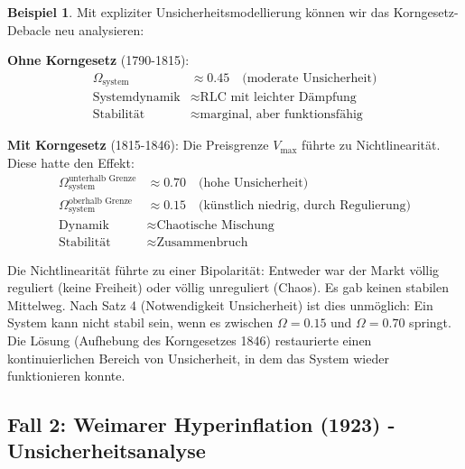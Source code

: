 \documentclass[a4paper,12pt,twoside]{report}
\theoremstyle{definition}
\newtheorem{beispiel}{Beispiel}
\begin{document}
\begin{beispiel}

Mit expliziter Unsicherheitsmodellierung können wir das Korngesetz-Debacle neu analysieren:

\textbf{Ohne Korngesetz} (1790-1815):
\begin{align}
\Omega_{\text{system}} &\approx 0.45 \quad \text{(moderate Unsicherheit)} \\
\text{Systemdynamik} &\approx \text{RLC mit leichter Dämpfung} \\
\text{Stabilität} &\approx \text{marginal, aber funktionsfähig}
\end{align}

\textbf{Mit Korngesetz} (1815-1846):
Die Preisgrenze $V_{\max}$ führte zu Nichtlinearität. Diese hatte den Effekt:
\begin{align}
\Omega_{\text{system}}^{\text{unterhalb Grenze}} &\approx 0.70 \quad \text{(hohe Unsicherheit)} \\
\Omega_{\text{system}}^{\text{oberhalb Grenze}} &\approx 0.15 \quad \text{(künstlich niedrig, durch Regulierung)} \\
\text{Dynamik} &\approx \text{Chaotische Mischung} \\
\text{Stabilität} &\approx \text{Zusammenbruch}
\end{align}

Die Nichtlinearität führte zu einer Bipolarität: Entweder war der Markt völlig reguliert (keine Freiheit) oder völlig unreguliert (Chaos). Es gab keinen stabilen Mittelweg.
Nach Satz 4 (Notwendigkeit Unsicherheit) ist dies unmöglich: Ein System kann nicht stabil sein, wenn es zwischen $\Omega = 0.15$ und $\Omega = 0.70$ springt.
Die Lösung (Aufhebung des Korngesetzes 1846) restaurierte einen kontinuierlichen Bereich von Unsicherheit, in dem das System wieder funktionieren konnte.

\end{beispiel}

\subsection{Fall 2: Weimarer Hyperinflation (1923) - Unsicherheitsanalyse}
\end{document}
